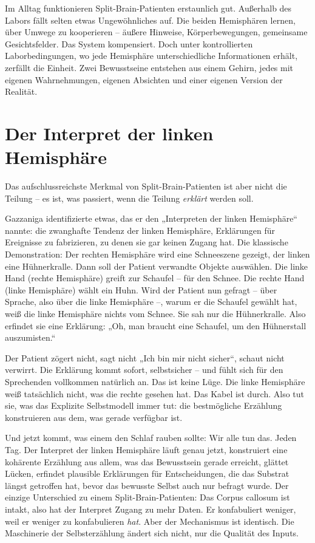 \documentclass[11pt, twoside, openright]{book}
\begin{document}
Im Alltag funktionieren Split-Brain-Patienten erstaunlich gut. Außerhalb des Labors fällt selten etwas Ungewöhnliches auf. Die beiden Hemisphären lernen, über Umwege zu kooperieren -- äußere Hinweise, Körperbewegungen, gemeinsame Gesichtsfelder. Das System kompensiert. Doch unter kontrollierten Laborbedingungen, wo jede Hemisphäre unterschiedliche Informationen erhält, zerfällt die Einheit. Zwei Bewusstseine entstehen aus einem Gehirn, jedes mit eigenen Wahrnehmungen, eigenen Absichten und einer eigenen Version der Realität.

\section*{Der Interpret der linken Hemisphäre}

Das aufschlussreichste Merkmal von Split-Brain-Patienten ist aber nicht die Teilung -- es ist, was passiert, wenn die Teilung \textit{erklärt} werden soll.

Gazzaniga identifizierte etwas, das er den „Interpreten der linken Hemisphäre“ nannte: die zwanghafte Tendenz der linken Hemisphäre, Erklärungen für Ereignisse zu fabrizieren, zu denen sie gar keinen Zugang hat. Die klassische Demonstration: Der rechten Hemisphäre wird eine Schneeszene gezeigt, der linken eine Hühnerkralle. Dann soll der Patient verwandte Objekte auswählen. Die linke Hand (rechte Hemisphäre) greift zur Schaufel -- für den Schnee. Die rechte Hand (linke Hemisphäre) wählt ein Huhn. Wird der Patient nun gefragt -- über Sprache, also über die linke Hemisphäre --, warum er die Schaufel gewählt hat, weiß die linke Hemisphäre nichts vom Schnee. Sie sah nur die Hühnerkralle. Also erfindet sie eine Erklärung: „Oh, man braucht eine Schaufel, um den Hühnerstall auszumisten.“

Der Patient zögert nicht, sagt nicht „Ich bin mir nicht sicher“, schaut nicht verwirrt. Die Erklärung kommt sofort, selbstsicher -- und fühlt sich für den Sprechenden vollkommen natürlich an. Das ist keine Lüge. Die linke Hemisphäre weiß tatsächlich nicht, was die rechte gesehen hat. Das Kabel ist durch. Also tut sie, was das Explizite Selbstmodell immer tut: die bestmögliche Erzählung konstruieren aus dem, was gerade verfügbar ist.

Und jetzt kommt, was einem den Schlaf rauben sollte: Wir alle tun das. Jeden Tag. Der Interpret der linken Hemisphäre läuft genau jetzt, konstruiert eine kohärente Erzählung aus allem, was das Bewusstsein gerade erreicht, glättet Lücken, erfindet plausible Erklärungen für Entscheidungen, die das Substrat längst getroffen hat, bevor das bewusste Selbst auch nur befragt wurde. Der einzige Unterschied zu einem Split-Brain-Patienten: Das Corpus callosum ist intakt, also hat der Interpret Zugang zu mehr Daten. Er konfabuliert weniger, weil er weniger zu konfabulieren \textit{hat}. Aber der Mechanismus ist identisch. Die Maschinerie der Selbsterzählung ändert sich nicht, nur die Qualität des Inputs.
\end{document}
